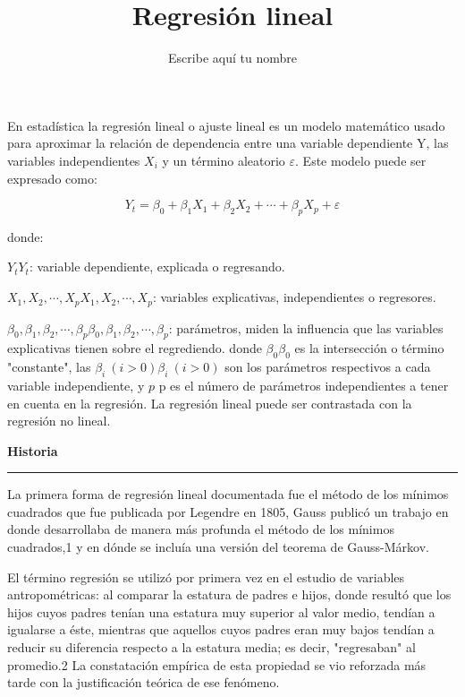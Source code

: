 \documentclass{article}
\title{Regresi\'on lineal}
\author{Escribe aqu\'i tu nombre}
\begin{document}

\maketitle

En estad\'istica la regresi\'on lineal o ajuste lineal es un modelo matem\'atico usado para aproximar la relaci\'on de dependencia entre una variable dependiente Y, las variables independientes $X_i$ y un t\'ermino aleatorio $\varepsilon$. Este modelo puede ser expresado como:

\[
{\displaystyle Y_{t}=\beta _{0}+\beta _{1}X_{1}+\beta _{2}X_{2}+\cdots +\beta _{p}X_{p}+\varepsilon }
\]

donde:

${\displaystyle Y_{t}} {\displaystyle Y_{t}}$: variable dependiente, explicada o regresando.

${\displaystyle X_{1},X_{2},\cdots ,X_{p}} {\displaystyle X_{1},X_{2},\cdots ,X_{p}}$: variables explicativas, independientes o regresores.

${\displaystyle \beta _{0},\beta _{1},\beta _{2},\cdots ,\beta _{p}} {\displaystyle \beta _{0},\beta _{1},\beta _{2},\cdots ,\beta _{p}}$: par\'ametros, miden la influencia que las variables explicativas tienen sobre el regrediendo.
donde ${\displaystyle \beta _{0}} \beta_0$ es la intersecci\'on o t\'ermino "constante", las ${\displaystyle \beta _{i}\ (i>0)} {\displaystyle \beta _{i}\ (i>0)}$ son los par\'ametros respectivos a cada variable independiente, y ${\displaystyle p}$ p es el número de par\'ametros independientes a tener en cuenta en la regresi\'on. La regresi\'on lineal puede ser contrastada con la regresi\'on no lineal.

\vspace{3mm}

\begin{flushleft}
{\large{\textbf{Historia}}}
\end{flushleft}

\vspace{1pt}

\hrule

La primera forma de regresi\'on lineal documentada fue el m\'etodo de los mínimos cuadrados que fue publicada por Legendre en 1805, Gauss public\'o un trabajo en donde desarrollaba de manera m\'as profunda el m\'etodo de los mínimos cuadrados,1​ y en d\'onde se incluía una versi\'on del teorema de Gauss-M\'arkov.

El t\'ermino regresi\'on se utiliz\'o por primera vez en el estudio de variables antropom\'etricas: al comparar la estatura de padres e hijos, donde result\'o que los hijos cuyos padres tenían una estatura muy superior al valor medio, tendían a igualarse a \'este, mientras que aquellos cuyos padres eran muy bajos tendían a reducir su diferencia respecto a la estatura media; es decir, "regresaban" al promedio.2​ La constataci\'on empírica de esta propiedad se vio reforzada m\'as tarde con la justificaci\'on te\'orica de ese fen\'omeno.
\end{document}
